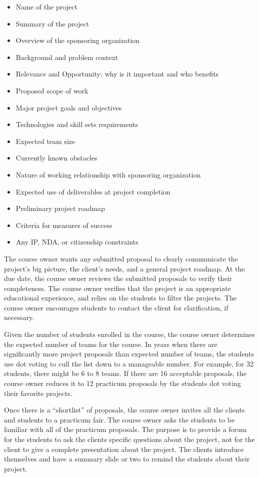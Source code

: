 \documentclass[conference]{IEEEtran}
\begin{document}
\begin{itemize}
\itemsep1pt\parskip0pt
\item
  {Name of the project}
\item
  {Summary of the project}
\item
  {Overview of the sponsoring organization}
\item
  {Background and problem context }
\item
  {Relevance and Opportunity: why is it important and who benefits}
\item
  {Proposed scope of work}
\item
  {Major project goals and objectives }
\item
  {Technologies and skill sets requirements }
\item
  {Expected team size }
\item
  {Currently known obstacles}
\item
  {Nature of working relationship with sponsoring organization}
\item
  {Expected use of deliverables at project completion}
\item
  {Preliminary project roadmap}
\item
  {Criteria for measures of success}
\item
  {Any IP, NDA, or citizenship constraints}
\end{itemize}

The course owner wants any submitted proposal to clearly communicate
the project's big picture, the client's needs, and a general project
roadmap. At the due date, the course owner reviews the submitted
proposals to verify their completeness. The course owner verifies that
the project is an appropriate educational experience, and relies on the
students to filter the projects. The course owner encourages
students to contact the client for clarification, if necessary.

Given the number of students enrolled in the course, the course owner
determines the expected number of teams for the course. In years when
there are significantly more project proposals than expected number of
teams, the students use dot voting to cull the list down to a manageable
number. For example, for 32 students, there might be 6 to 8 teams. If
there are 16 acceptable proposals, the course owner reduces it to 12
practicum proposals by the students dot voting their favorite projects.

Once there is a ``shortlist'' of proposals, the course owner invites
all the clients and students to a practicum fair. The course owner asks
the students to be familiar with all of the practicum proposals. The
purpose is to provide a forum for the students to ask the clients
specific questions about the project, not for the client to give a
complete presentation about the project. The clients introduce themselves
and have a summary slide or two to remind the students about their
project. 
\end{document}
